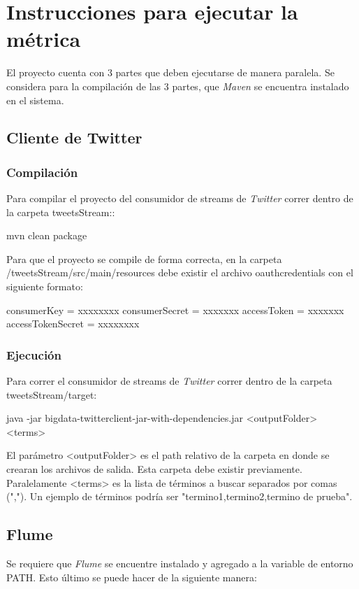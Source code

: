 \documentclass[a4paper,10pt]{article}
\begin{document}
\section{Instrucciones para ejecutar la métrica}

El proyecto cuenta con 3 partes que deben ejecutarse de manera paralela.
Se considera para la compilación de las 3 partes, que \textit{Maven} se encuentra instalado en el sistema.

\subsection{Cliente de Twitter}

\subsubsection{Compilación}

Para compilar el proyecto del consumidor de streams de \textit{Twitter} correr dentro de la carpeta tweetsStream::

    mvn clean package
	
Para que el proyecto se compile de forma correcta, en la carpeta /tweetsStream/src/main/resources debe existir el archivo oauthcredentials con el siguiente formato:

consumerKey = xxxxxxxx
consumerSecret = xxxxxxx
accessToken = xxxxxxx
accessTokenSecret = xxxxxxxx

\subsubsection{Ejecución}

Para correr el consumidor de streams de \textit{Twitter} correr dentro de la carpeta tweetsStream/target:

	java -jar bigdata-twitterclient-jar-with-dependencies.jar <outputFolder> <terms>

El parámetro <outputFolder> es el path relativo de la carpeta en donde se crearan los archivos de salida. Esta carpeta debe existir previamente. 
Paralelamente <terms> es la lista de términos a buscar separados por comas (","). Un ejemplo de términos podría ser "termino1,termino2,termino de prueba".

\subsection{Flume}

Se requiere que \textit{Flume} se encuentre instalado y agregado a la variable de entorno PATH. 
Esto último se puede hacer de la siguiente manera:
\end{document}
